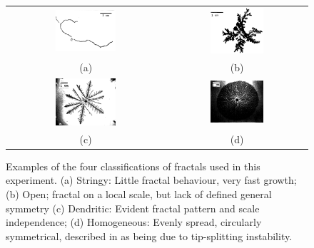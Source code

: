 \documentclass{article}
\theoremstyle{definition}
\theoremstyle{remark}
\begin{document}
\begin{figure}[H]
        \centering
        \begin{tabular}{cc}
                \includegraphics[width=0.4\textwidth]{Stringy_fractal.png} & \includegraphics[width=0.4\textwidth]{Open_fractal'.png}\\
                (a) & (b)\\
                \includegraphics[width=0.4\textwidth]{Dendritic_fractal.png} & \includegraphics[width=0.4\textwidth]{Homogeneous_fractal.png}\\
                (c) & (d)
        \end{tabular}
        \caption{\label{fig:fractal types}Examples of the four classifications of fractals used in this experiment. (a) Stringy: Little fractal behaviour, very fast growth; (b) Open; fractal on a local scale, but lack of defined general symmetry (c) Dendritic: Evident fractal pattern and scale independence; (d) Homogeneous: Evenly spread, circularly symmetrical, described in \cite{PhysRevLett.56.1260} as being due to tip-splitting instability.}
\end{figure}
\end{document}
